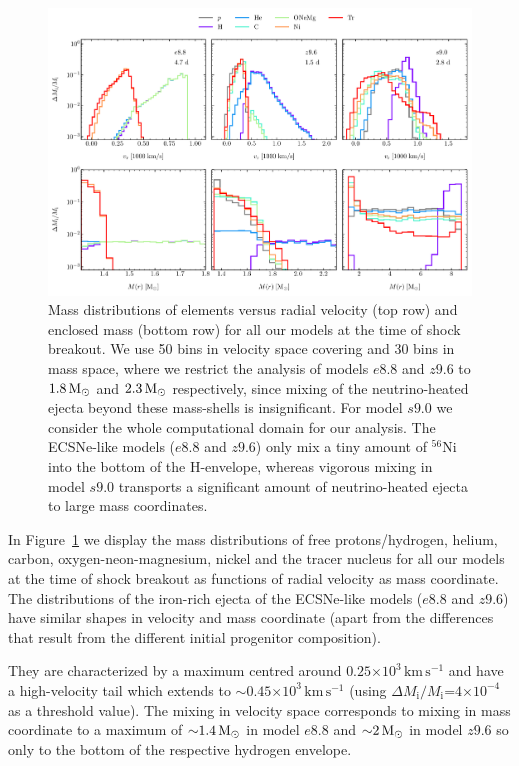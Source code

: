 \documentclass[fleqn,usenatbib]{mnras}
\newcommand{\nickel}{\ensuremath{\mathrm{^{56}Ni}}\xspace}
\newcommand{\solm}{\ensuremath{\rm{M_{\odot}}}\xspace}
\newcommand{\kms}{\ensuremath{\mathrm{km\, s^{-1}}}}
\begin{document}
\begin{figure}%
 \centering
 \includegraphics[width=\textwidth,trim=0cm 0.0cm 0cm 0cm, clip]{pic/z96_s9_e8_3d_massDis_mvr_and_masstime_sbo_paper.pdf}
 \caption{Mass distributions of elements versus radial velocity (top row) and enclosed mass (bottom row) for all our models at the time of shock breakout. We use 50 bins in velocity space covering and 30 bins in mass space, where we restrict the analysis of models $e8.8$ and $z9.6$ to $1.8\,\solm$ and $2.3\,\solm$ respectively, since mixing of the neutrino-heated ejecta beyond these mass-shells is insignificant. For model $s9.0$ we consider the whole computational domain for our analysis.
 The ECSNe-like models ($e8.8$ and $z9.6$) only mix a tiny amount of \nickel into the bottom of the H-envelope, whereas vigorous mixing in model $s9.0$ transports a significant amount of 
 neutrino-heated ejecta to large mass coordinates.}
 \label{fig:mass distribution sbo}
\end{figure}

In Figure~\ref{fig:mass distribution sbo} we display the mass distributions of free protons/hydrogen, helium, carbon, oxygen-neon-magnesium, nickel and the tracer nucleus for all our models at the time of shock breakout as functions of radial velocity as mass coordinate. 
The distributions of the iron-rich ejecta of the ECSNe-like models ($e8.8$ and $z9.6$) have similar shapes in velocity and mass coordinate (apart from the differences that result from the different initial progenitor composition). 

They are characterized by a maximum centred around $0.25\mathord{\times}10^3\,\kms$ and have a high-velocity tail which extends to $\mathord{\sim}0.45\mathord{\times}10^3\,\kms$ (using $\Delta M_{\mathrm{i}}/ M_{\mathrm{i}}\mathord{=}4\mathord{\times}10^{-4}$ as a threshold value). The mixing in velocity space corresponds to mixing in mass coordinate to a maximum of $\mathord{\sim}1.4\,\solm$ in model $e8.8$ and $\mathord{\sim}2\,\solm$ in model $z9.6$ so only to the bottom of the respective hydrogen envelope. 
\end{document}
